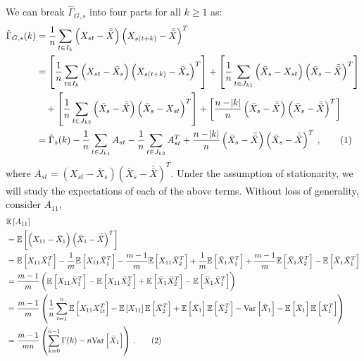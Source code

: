 \documentclass[12pt]{article}
\newcommand{\E}{\mathbb{E}}
\newcommand\numberthis{\addtocounter{equation}{1}\tag{\theequation}}
\theoremstyle{remark}
\begin{document}
 
We can break $\hat{\Gamma}_{G,s}$ into four parts for all $k \geq 1$ as:
%
\begin{align*}
\hat{\Gamma}_{G,s}(k) & = \dfrac{1}{n}\sum_{t \in I_k} \left(X_{st} - \bar{\bar{X}} \right) \left(X_{s(t+k)} - \bar{\bar{X}} \right)^T \\
    &= \left[\dfrac{1}{n} \sum_{t \in I_k} \left(X_{st} - \bar{X}_s \right) \left(X_{s(t+k)} - \bar{X}_s \right)^T \right] + \left[\dfrac{1}{n} \sum_{t \in J_{k1}}  \left( \bar{X}_s - X_{st} \right)  \left(\bar{X}_s - \bar{\bar{X}} \right)^T\right]\\ 
    & \quad + \left[\dfrac{1}{n} \sum_{t \in J_{k2}} \left(\bar{X}_s - \bar{\bar{X}} \right)  \left(\bar{X}_s - X_{st} \right)^T\right]   + \left[\dfrac{n-\abs{k}}{n} \left(\bar{X}_s - \bar{\bar{X}}\right)   \left(\bar{X}_s - \bar{\bar{X}} \right)^T\right]\\
    &= \hat{\Gamma}_s(k) - \dfrac{1}{n}\sum_{t \in J_{k1}}A_{st} - \dfrac{1}{n} \sum_{t \in J_{k2}}A_{st}^T  + \dfrac{n-\abs{k}}{n}  \left(\bar{X}_s - \bar{\bar{X}} \right)  \left(\bar{X}_s - \bar{\bar{X}} \right)^T\,, \numberthis \label{eq:acf_breakdown}
\end{align*}
%
where $A_{st} = (X_{st}-\bar{X}_s)(\bar{X}_s - \bar{\bar{X}})^T$. Under the assumption of stationarity, we will study the expectations of each of the above terms. Without loss of generality, consider $A_{11}$,
\begin{align*}
    &\E \left[A_{11} \right]\\
     &= \mathbb{E} \left[ \left(X_{11} - \bar{X}_1 \right) \left(\bar{X}_1 - \bar{\bar{X}} \right)^T \right]\\
    &= \mathbb{E} \left[X_{11}\bar{X}_1^T \right] - \dfrac{1}{m}\mathbb{E} \left[X_{11}\bar{X}_1^T \right] - \dfrac{m-1}{m}\mathbb{E} \left[X_{11}\bar{X}_2^T \right] + \dfrac{1}{m}\mathbb{E} \left[\bar{X}_1\bar{X}_1^T \right] + \dfrac{m-1}{m}\mathbb{E} \left[\bar{X}_1\bar{X}_2^T \right] - \mathbb{E} \left[\bar{X}_1\bar{X}_1^T \right]\\
    &= \dfrac{m-1}{m}\left(\mathbb{E} \left[X_{11}\bar{X}_1^T \right] - \mathbb{E} \left[X_{11}\bar{X}_2^T \right] + \mathbb{E} \left[\bar{X}_1\bar{X}_2^T \right] - \mathbb{E} \left[\bar{X}_1\bar{X}_1^T \right]\right)\\
    &= \dfrac{m-1}{m}\left(\dfrac{1}{n}\sum_{t=1}^{n}\mathbb{E} \left[X_{11}X_{1t}^T \right] - \mathbb{E}\left[X_{11}\right] \mathbb{E}\left[\bar{X}_2^T \right] + \mathbb{E} \left[\bar{X}_1\right]\mathbb{E}\left[\bar{X}_2^T\right] - \text{Var}\left[\bar{X}_1 \right] - \mathbb{E}\left[\bar{X}_1 \right]\mathbb{E}\left[\bar{X}_1^T \right]\right)\\
    &= \dfrac{m-1}{mn}\left(\sum_{k=0}^{n-1}\Gamma(k) - n\text{Var}\left[\bar{X}_1 \right]\right)\,. \numberthis \label{eq:acf_2}
\end{align*}
\end{document}
